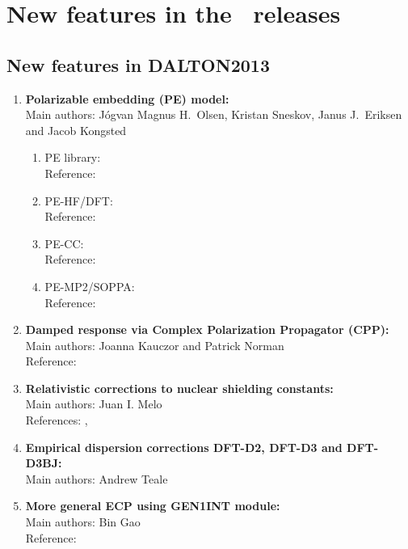 \chapter{New features in the \dalton\ releases}

\section{New features in DALTON2013}

\begin{enumerate}
\item{\bf  Polarizable embedding (PE) model:}  \\
Main authors: J\'{o}gvan Magnus H.\ Olsen, Kristan Sneskov, Janus J.\ Eriksen and Jacob Kongsted
\begin{enumerate}
  \item{PE library:}  \\
   Reference:  \cite{pelib2012}
  \item{PE-HF/DFT:}  \\
   Reference:  \cite{pescf}
  \item{PE-CC:}  \\
   Reference:  \cite{pecc}
  \item{PE-MP2/SOPPA:}  \\
   Reference:  \cite{pesoppa}
\end{enumerate}
\vspace{1cm}
\item{\bf  Damped response via Complex Polarization Propagator (CPP):} \\
Main authors: Joanna Kauczor and Patrick Norman \\
Reference:  \cite{kauczor:2011}
\item{\bf  Relativistic corrections to nuclear shielding constants:}  \\
Main authors: Juan I. Melo \\
 References:   \cite{melojcp03},  \cite{melomaldojcp12}
\item{\bf  Empirical dispersion corrections DFT-D2, DFT-D3 and DFT-D3BJ:}  \\
Main authors: Andrew Teale
\item{\bf  More general ECP using GEN1INT module:} \\
Main authors: Bin Gao \\
 Reference:  \cite{gen1int}

\end{enumerate}
